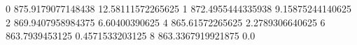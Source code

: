 0 875.9179077148438 12.58111572265625
1 872.4955444335938 9.15875244140625
2 869.9407958984375 6.60400390625
4 865.61572265625 2.2789306640625
6 863.7939453125 0.4571533203125
8 863.3367919921875 0.0
